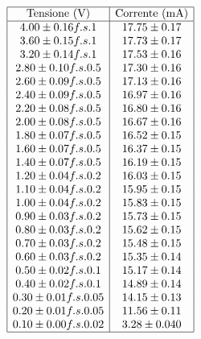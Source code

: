 \documentclass[a4paper,11pt]{article}
\begin{document}
\begin{minipage}{0.4\textwidth}
        \[
\begin{array}{|c|c|}
\hline
\text{Tensione (V)} & \text{Corrente (mA)}
\\ \hline
4.00 \pm 0.16 f.s. 1 & 17.75 \pm 0.17 \\ 
3.60 \pm 0.15 f.s. 1 & 17.73 \pm 0.17 \\ 
3.20 \pm 0.14 f.s. 1 & 17.53 \pm 0.16 \\ 
2.80 \pm 0.10 f.s. 0.5 & 17.30 \pm 0.16 \\ 
2.60 \pm 0.09 f.s. 0.5 & 17.13 \pm 0.16 \\ 
2.40 \pm 0.09 f.s. 0.5 & 16.97 \pm 0.16 \\ 
2.20 \pm 0.08 f.s. 0.5 & 16.80 \pm 0.16 \\ 
2.00 \pm 0.08 f.s. 0.5 & 16.67 \pm 0.16 \\ 
1.80 \pm 0.07 f.s. 0.5 & 16.52 \pm 0.15 \\ 
1.60 \pm 0.07 f.s. 0.5 & 16.37 \pm 0.15 \\ 
1.40 \pm 0.07 f.s. 0.5 & 16.19 \pm 0.15 \\ 
1.20 \pm 0.04 f.s. 0.2 & 16.03 \pm 0.15 \\ 
1.10 \pm 0.04 f.s. 0.2 & 15.95 \pm 0.15 \\ 
1.00 \pm 0.04 f.s. 0.2 & 15.83 \pm 0.15 \\ 
0.90 \pm 0.03 f.s. 0.2 & 15.73 \pm 0.15 \\ 
0.80 \pm 0.03 f.s. 0.2 & 15.62 \pm 0.15 \\ 
0.70 \pm 0.03 f.s. 0.2 & 15.48 \pm 0.15 \\ 
0.60 \pm 0.03 f.s. 0.2 & 15.35 \pm 0.14 \\ 
0.50 \pm 0.02 f.s. 0.1 & 15.17 \pm 0.14 \\ 
0.40 \pm 0.02 f.s. 0.1 & 14.89 \pm 0.14 \\ 
0.30 \pm 0.01 f.s. 0.05 & 14.15 \pm 0.13 \\ 
0.20 \pm 0.01 f.s. 0.05 & 11.56 \pm 0.11 \\ 
0.10 \pm 0.00 f.s. 0.02 & 3.28 \pm 0.040 \\ 
\hline
\label{tab::dati_100}
\end{array}
\]
    \end{minipage}
    \hfill %
\end{document}
